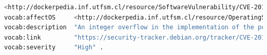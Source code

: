 \begin{lstlisting}[caption={Ejemplo de triples de la vulnerabilidad de glibc},label={lst:vulnerability},language=bash]
<http://dockerpedia.inf.utfsm.cl/resource/SoftwareVulnerability/CVE-2018-6485>
vocab:affectOS     <http://dockerpedia.inf.utfsm.cl/resource/OperatingSystem/ubuntu%3A16.04> , <http://dockerpedia.inf.utfsm.cl/resource/OperatingSystem/debian%3A9> ;
vocab:description  "An integer overflow in the implementation of the posix_memalign in memalign functions in the GNU C Library (aka glibc or libc6) 2.26 and earlier could cause these functions to return a pointer to a heap area that is too small, potentially leading to heap corruption." ;
vocab:link         "https://security-tracker.debian.org/tracker/CVE-2018-6485" , "http://people.ubuntu.com/~ubuntu-security/cve/CVE-2018-6485" ;
vocab:severity     "High" .
\end{lstlisting}











